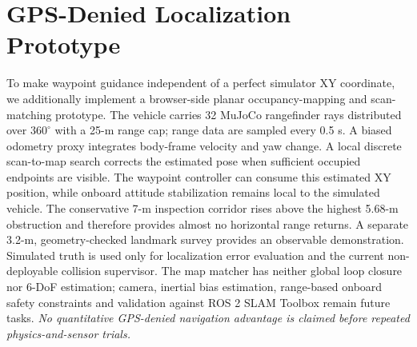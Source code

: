 \documentclass[conference]{IEEEtran}
\begin{document}
\section{GPS-Denied Localization Prototype}
To make waypoint guidance independent of a perfect simulator XY coordinate, we additionally implement a browser-side planar occupancy-mapping and scan-matching prototype. The vehicle carries 32 MuJoCo rangefinder rays distributed over $360^\circ$ with a 25-m range cap; range data are sampled every 0.5 s. A biased odometry proxy integrates body-frame velocity and yaw change. A local discrete scan-to-map search corrects the estimated pose when sufficient occupied endpoints are visible. The waypoint controller can consume this estimated XY position, while onboard attitude stabilization remains local to the simulated vehicle.
The conservative 7-m inspection corridor rises above the highest 5.68-m obstruction and therefore provides almost no horizontal range returns. A separate 3.2-m, geometry-checked landmark survey provides an observable demonstration. Simulated truth is used only for localization error evaluation and the current non-deployable collision supervisor. The map matcher has neither global loop closure nor 6-DoF estimation; camera, inertial bias estimation, range-based onboard safety constraints and validation against ROS 2 SLAM Toolbox \cite{slamtoolbox} remain future tasks. \emph{No quantitative GPS-denied navigation advantage is claimed before repeated physics-and-sensor trials.}
\end{document}
